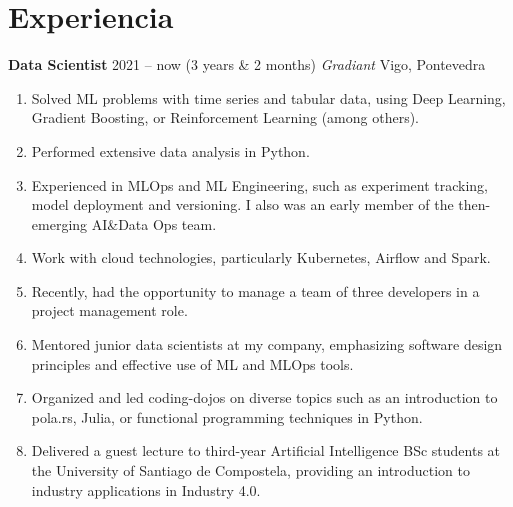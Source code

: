 \documentclass[a4]{article}
\newcommand{\cvitem}[4]{
    \noindent
    \textbf{\large #1}  \hfill {\small #2} \newline
    \textit{#3}         \hfill #4
}
\begin{document}

\section*{Experiencia}
\cvitem
    {Data Scientist}
    {2021 -- now (3 years \& 2 months)}
    {Gradiant}
    {Vigo, Pontevedra}
\begin{enumerate}[label=\textbullet, itemsep=-1pt, rightmargin=0.5cm]
  \item Solved ML problems with time series and tabular data, using Deep
Learning, Gradient Boosting, or Reinforcement Learning (among
others).\item Performed extensive data analysis in
Python.\item Experienced in MLOps and ML Engineering, such as experiment
tracking, model deployment and versioning. I also was an early member of
the then-emerging AI\&Data Ops team.\item Work with cloud technologies,
particularly Kubernetes, Airflow and Spark.\item Recently, had the
opportunity to manage a team of three developers in a project management
role.\item Mentored junior data scientists at my company, emphasizing
software design principles and effective use of ML and MLOps
tools.\item Organized and led coding-dojos on diverse topics such as an
introduction to pola.rs, Julia, or functional programming techniques in
Python.\item Delivered a guest lecture to third-year Artificial
Intelligence BSc students at the University of Santiago de Compostela,
providing an introduction to industry applications in Industry 4.0.
\end{enumerate}
\end{document}
